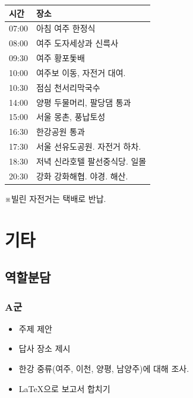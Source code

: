 \documentclass[chapter, oneside]{oblivoir}
\begin{document}
\begin{table}[ht]
    \begin{center}
    \begin{tabular}{rl}
    \multicolumn{1}{l}{시간}     & \multicolumn{1}{l}{장소} \\ \hline
    \multicolumn{1}{r|}{07:00} & 아침   여주 한정식         \\
    \multicolumn{1}{r|}{08:00} & 여주   도자세상과 신륵사      \\
    \multicolumn{1}{r|}{09:30} & 여주   황포돛배           \\
    \multicolumn{1}{r|}{10:00} & 여주보 이동, 자전거 대여.     \\
    \multicolumn{1}{r|}{10:30} & 점심   천서리막국수         \\
    \multicolumn{1}{r|}{14:00} & 양평 두물머리, 팔당댐 통과     \\
    \multicolumn{1}{r|}{15:00} & 서울 몽촌, 풍납토성         \\
    \multicolumn{1}{r|}{16:30} & 한강공원   통과           \\
    \multicolumn{1}{r|}{17:30} & 서울   선유도공원. 자전거 하차. \\
    \multicolumn{1}{r|}{18:30} & 저녁   신라호텔 팔선중식당. 일몰 \\
    \multicolumn{1}{r|}{20:30} & 강화   강화해협. 야경. 해산. 
    \end{tabular}   
    \end{center}
\end{table}
※빌린 자전거는 택배로 반납.






\chapter{기타}
\section{역할분담}
\subsection{A군}
\begin{itemize}
    \item 주제 제안
    \item 답사 장소 제시
    \item 한강 중류(여주, 이천, 양평, 남양주)에 대해 조사.
    \item LaTeX으로 보고서 합치기
\end{itemize}
\end{document}

